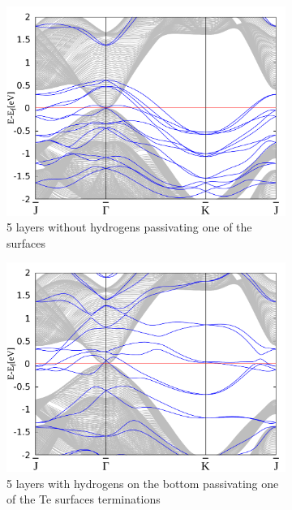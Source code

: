 	\begin{figure}[htbp]
		\begin{subfigure}[c]{.48\linewidth}
			\centering
			\includegraphics[width=\linewidth]{Te_termination/no_H_bulk+5_layers_no_dos_-2_2.pdf}
			\caption{5 layers without hydrogens passivating one of the surfaces}
		\end{subfigure}
		\hfill
		\begin{subfigure}[c]{.48\linewidth}
			\centering
			\includegraphics[width=\linewidth]{Te_termination/bulk+5_layers_no_dos_-2_2.pdf}
			\caption{5 layers with hydrogens on the bottom passivating one of the Te surfaces terminations}
		\end{subfigure}
		\begin{subfigure}[c]{.48\linewidth}

\end{subfigure}
\end{figure}
